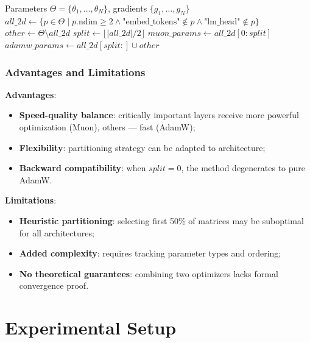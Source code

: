 \documentclass[a4paper,12pt]{article}
\begin{document}
\begin{algorithm}[H]
\caption{Hybrid: Combined update of all parameters}
\label{alg:hybrid}
\begin{algorithmic}[1]
\Require Parameters $\Theta = \{\theta_1, \ldots, \theta_N\}$, gradients $\{g_1, \ldots, g_N\}$
\State {}
\State $all\_2d \gets \{ p \in \Theta \mid p.\text{ndim} \ge 2 \land \text{"embed\_tokens"} \notin p \land \text{"lm\_head"} \notin p \}$
\State $other \gets \Theta \setminus all\_2d$
\State {}
\State $split \gets \lfloor |all\_2d| / 2 \rfloor$
\State $muon\_params \gets all\_2d[0:split]$
\State $adamw\_params \gets all\_2d[split:] \cup other$
\State {}
\State \Return {}
\end{algorithmic}
\end{algorithm}

\subsubsection{Advantages and Limitations}

\textbf{Advantages}:
\begin{itemize}
    \item \textbf{Speed-quality balance}: critically important layers receive more powerful optimization (Muon), others --- fast (AdamW);
    \item \textbf{Flexibility}: partitioning strategy can be adapted to architecture;
    \item \textbf{Backward compatibility}: when $split = 0$, the method degenerates to pure AdamW.
\end{itemize}

\textbf{Limitations}:
\begin{itemize}
    \item \textbf{Heuristic partitioning}: selecting first 50\% of matrices may be suboptimal for all architectures;
    \item \textbf{Added complexity}: requires tracking parameter types and ordering;
    \item \textbf{No theoretical guarantees}: combining two optimizers lacks formal convergence proof.
\end{itemize}
\newpage

\section{Experimental Setup}
\label{sec:experiments}
\end{document}
